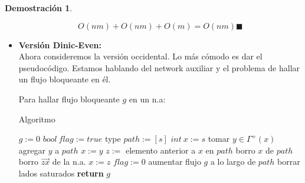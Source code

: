 \documentclass[11pt, a4paper]{article}
\theoremstyle{definition}
\newtheorem*{demostracion}{Demostración}
\begin{document}
\begin{demostracion}
\begin{itemize}
        \[
        O(nm) + O(nm) + O(m) = O(nm) \blacksquare
        \]
        \item \textbf{Versión Dinic-Even: } \\
        Ahora consideremos la versión occidental. Lo más cómodo es dar el pseudocódigo. Estamos hablando del network auxiliar y el problema de hallar un flujo bloqueante en él.

        Para hallar flujo bloqueante $g$ en un n.a:
        \begin{algorithm}[!ht]
            \caption{Algoritmo}
            \begin{algorithmic}[1]
            \State $g := 0$
            \State $bool\ flag := true$
               \State type $path := [s]$
               \State $int\ x := s$
                       \State tomar $y \in \Gamma^+(x)$
                       \State agregar $y$ a $path$
                       \State $x := y$ 
                   \Else
                           \State $z :=$ elemento anterior a $x$ en $path$ 
                           \State borro $x$ de $path$
                           \State borro $\overrightarrow{zx}$ de la n.a.
                           \State $x := z$
                       \Else
                           \State $flag := 0$
                       \EndIf
                   \EndIf
               \EndWhile
                   \State aumentar flujo $g$ a lo largo de $path$ 
                   \State borrar lados saturados
               \EndIf
            \EndWhile
            \State \textbf{return} $g$
            \end{algorithmic}
            \end{algorithm}
            \FloatBarrier


\end{itemize}
\end{demostracion}
\end{document}
